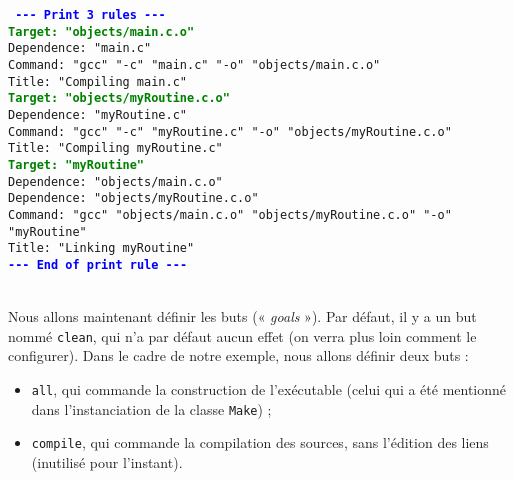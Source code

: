 \documentclass[a4paper,11pt]{extarticle}
\begin{document}
\begin{mdframed}[hidealllines=true,backgroundcolor=lightgray!20]
\tt\footnotesize
\textcolor{blue}{\bf{-}{-}{-} Print 3 rules {-}{-}{-}}\\
\textcolor{green}{\bf Target: "objects/main.c.o"}\\
\hspace*{1.2em}Dependence: "main.c"\\
\hspace*{1.2em}Command:  "gcc" "-c" "main.c" "-o" "objects/main.c.o"\\
\hspace*{1.2em}Title: "Compiling main.c"\\
\textcolor{green}{\bf Target: "objects/myRoutine.c.o"}\\
\hspace*{1.2em}Dependence: "myRoutine.c"\\
\hspace*{1.2em}Command:  "gcc" "-c" "myRoutine.c" "-o" "objects/myRoutine.c.o"\\
\hspace*{1.2em}Title: "Compiling myRoutine.c"\\
\textcolor{green}{\bf Target: "myRoutine"}\\
\hspace*{1.2em}Dependence: "objects/main.c.o"\\
\hspace*{1.2em}Dependence: "objects/myRoutine.c.o"\\
\hspace*{1.2em}Command:  "gcc" "objects/main.c.o" "objects/myRoutine.c.o" "-o" "myRoutine"\\
\hspace*{1.2em}Title: "Linking myRoutine"\\
\textcolor{blue}{\bf{-}{-}{-} End of print rule {-}{-}{-}}
\end{mdframed}

~\\Nous allons maintenant définir les buts (« \emph{goals} »). Par défaut, il y a un but nommé \texttt{clean}, qui n'a par défaut aucun effet (on verra plus loin comment le configurer). Dans le cadre de notre exemple, nous allons définir deux buts :
\begin{itemize}
  \item \texttt{all}, qui commande la construction de l'exécutable (celui qui a été mentionné dans l'instanciation de la classe \texttt{Make}) ;
  \item \texttt{compile}, qui commande la compilation des sources, sans l'édition des liens (inutilisé pour l'instant).
\end{itemize}
\end{document}

